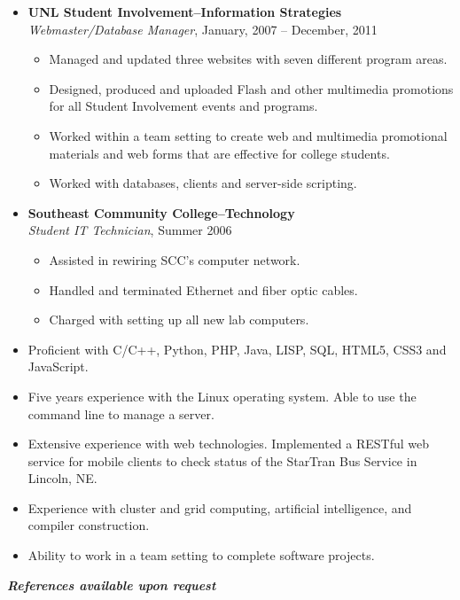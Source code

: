 \documentclass[12pt]{report}
\begin{document}
\begin{center}
{{
\begin{itemize}
\item\textbf{UNL Student Involvement--Information Strategies}\\
\textit{Webmaster/Database Manager}, January, 2007 -- December, 2011
\begin{itemize}
\item Managed and updated three websites with seven different program areas.
\item Designed, produced and uploaded Flash and other multimedia promotions for all Student Involvement events and programs.
\item Worked within a team setting to create web and multimedia promotional materials and web forms that are effective for college students.
\item Worked with databases, clients and server-side scripting.
\end{itemize}
\item\textbf{Southeast Community College--Technology}\\
\textit{Student IT Technician}, Summer 2006
\begin{itemize}
\item Assisted in rewiring SCC's computer network.
\item Handled and terminated Ethernet and fiber optic cables.
\item Charged with setting up all new lab computers.
\end{itemize}
\end{itemize}

\begin{itemize}
\item Proficient with C/C++, Python, PHP, Java, LISP, SQL, HTML5, CSS3 and JavaScript.
\item Five years experience with the Linux operating system. Able to use the command line to manage a server.
\item Extensive experience with web technologies.  Implemented a RESTful web service for mobile clients to check status of the StarTran Bus Service in Lincoln, NE.
\item Experience with cluster and grid computing, artificial intelligence, and compiler construction.
\item Ability to work in a team setting to complete software projects.
\end{itemize}
}}

\noindent\textbf{\textit{References available upon request}}
\end{center}

\noindent\colorbox{MidnightBlue}{%
\noindent\parbox{8.0in}{\textcolor{White}{%
\begin{center}
\vspace{0.0625in}
\vspace{0.0625in}
\end{center}
}}}
\end{document}
